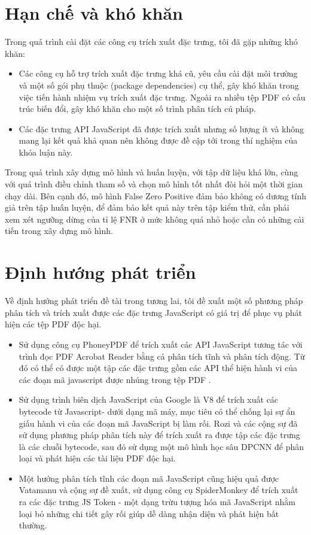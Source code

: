 \documentclass[./../main.tex]{subfiles}
\begin{document}
\section{Hạn chế và khó khăn}

Trong quá trình cài đặt các công cụ trích xuất đặc trưng, tôi đã gặp những khó khăn:
\begin{itemize}
	\item
	      Các công cụ hỗ trợ trích xuất đặc trưng khá cũ, yêu cầu cài đặt môi trường và một số gói phụ thuộc (package dependencies) cụ thể, gây khó khăn trong việc tiến hành nhiệm vụ trích xuất đặc trưng. Ngoài ra nhiều tệp PDF có cấu trúc biến đổi, gây khó khăn cho một số trình phân tích cú pháp.
	\item
	      Các đặc trưng API JavaScript đã được trích xuất nhưng số lượng ít và không mang lại kết quả khả quan nên không được đề cập tới trong thí nghiệm của khóa luận này.

\end{itemize}
Trong quá trình xây dựng mô hình và huấn luyện, với tập dữ liệu khá lớn, cùng với quá trình điều chỉnh tham số và chọn mô hình tốt nhất đòi hỏi một thời gian chạy dài. Bên cạnh đó, mô hình False Zero Positive đảm bảo không có dương tính giả trên tập huấn luyện, để đảm bảo kết quả này trên tập kiểm thử, cần phải xem xét ngưỡng dừng của tỉ lệ FNR ở mức không quá nhỏ hoặc cần có những cải tiến trong xây dựng mô hình.

\section{Định hướng phát triển}

Về định hướng phát triển đề tài trong tương lai, tôi đề xuất một số phương pháp phân tích và trích xuất được các đặc trưng JavaScript có giá trị để phục vụ phát hiện các tệp PDF độc hại.
\begin{itemize}
	\item Sử dụng công cụ PhoneyPDF để trích xuất các API JavaScript tương tác với trình đọc PDF Acrobat Reader bằng cả phân tích tĩnh và phân tích động. Từ đó có thể có được một tập các đặc trưng gồm các API thể hiện hành vi của các đoạn mã javascript được nhúng trong tệp PDF \cite{luxor}.
	\item Sử dụng trình biên dịch JavaScript của Google là V8 để trích xuất các bytecode từ Javascript- dưới dạng mã máy, mục tiêu có thể chống lại sự ẩn giấu hành vi của các đoạn mã JavaScript bị làm rối. Rozi và các cộng sự \cite{bytecode} đã sử dụng phương pháp phân tích này để trích xuất ra được tập các đặc trưng là các chuỗi bytecode, sau đó sử dụng một mô hình học sâu DPCNN \cite{dpcnn} để phân loại và phát hiện các tài liệu PDF độc hại.
	\item Một hướng phân tích tĩnh các đoạn mã JavaScript cũng hiệu quả được Vatamanu và cộng sự \cite{vatamanu} đề xuất, sử dụng công cụ SpiderMonkey để trích xuất ra các đặc trưng JS Token - một dạng trừu tượng hóa mã JavaScript nhằm loại bỏ những chi tiết gây rối giúp dễ dàng nhận diện và phát hiện bất thường.
\end{itemize}
\end{document}
